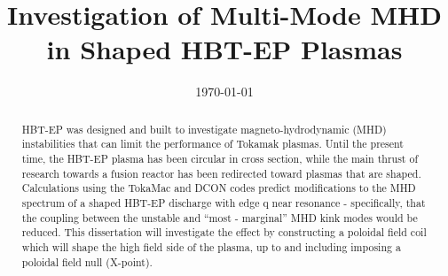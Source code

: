 \documentclass[aps,prl,twocolumn,superscriptaddress,groupedaddress]{revtex4}  %
\begin{document}
\widetext
{}


\title{Investigation of Multi-Mode MHD in Shaped HBT-EP Plasmas}%
\date{\today}


\begin{abstract}
HBT-EP was designed and built to investigate magneto-hydrodynamic (MHD) instabilities that can limit the performance of Tokamak plasmas.  Until the present time, the HBT-EP plasma has been circular in cross section, while the main thrust of research towards a fusion reactor has been redirected toward plasmas that are shaped.  Calculations using the TokaMac and DCON codes predict modifications to the MHD spectrum of a shaped HBT-EP discharge with edge q near resonance - specifically, that the coupling between the unstable and ``most - marginal'' MHD kink modes would be reduced\cite{Maurer}.  This dissertation will investigate the effect by constructing a poloidal field coil which will shape the high field side of the plasma, up to and including imposing a poloidal field null (X-point).
\end{abstract}

\maketitle
\end{document}
